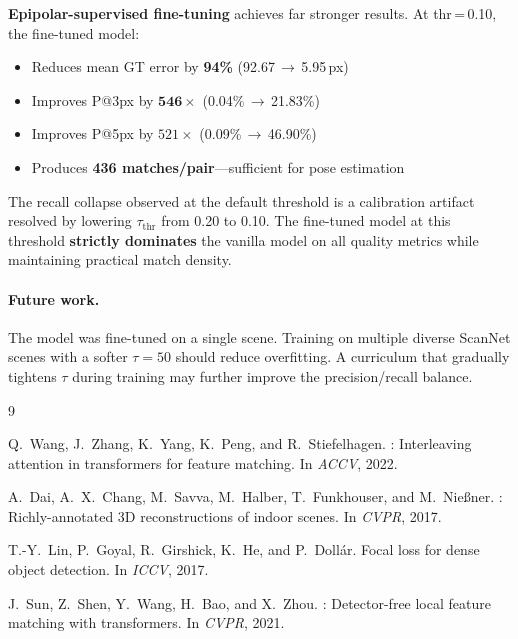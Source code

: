 \documentclass[10pt]{article}
\begin{document}
\textbf{Epipolar-supervised fine-tuning} achieves far stronger results. At thr\,=\,0.10, the fine-tuned model:
\begin{itemize}[leftmargin=*,itemsep=1pt]
    \item Reduces mean GT error by \textbf{94\%} (92.67\,$\to$\,5.95\,px)
    \item Improves P@3px by $\mathbf{546\times}$ (0.04\%\,$\to$\,21.83\%)
    \item Improves P@5px by $521\times$ (0.09\%\,$\to$\,46.90\%)
    \item Produces \textbf{436 matches/pair}---sufficient for pose estimation
\end{itemize}

The recall collapse observed at the default threshold is a calibration artifact resolved by lowering $\tau_{\text{thr}}$ from 0.20 to 0.10. The fine-tuned model at this threshold \textbf{strictly dominates} the vanilla model on all quality metrics while maintaining practical match density.

\paragraph{Future work.} The model was fine-tuned on a single scene. Training on multiple diverse ScanNet scenes with a softer $\tau = 50$ should reduce overfitting. A curriculum that gradually tightens $\tau$ during training may further improve the precision/recall balance.


\begin{thebibliography}{9}

Q.~Wang, J.~Zhang, K.~Yang, K.~Peng, and R.~Stiefelhagen.
: Interleaving attention in transformers for feature matching.
\newblock In \emph{ACCV}, 2022.

A.~Dai, A.~X.~Chang, M.~Savva, M.~Halber, T.~Funkhouser, and M.~Nie{\ss}ner.
: Richly-annotated 3D reconstructions of indoor scenes.
\newblock In \emph{CVPR}, 2017.

T.-Y.~Lin, P.~Goyal, R.~Girshick, K.~He, and P.~Doll{\'a}r.
\newblock Focal loss for dense object detection.
\newblock In \emph{ICCV}, 2017.

J.~Sun, Z.~Shen, Y.~Wang, H.~Bao, and X.~Zhou.
: Detector-free local feature matching with transformers.
\newblock In \emph{CVPR}, 2021.

\end{thebibliography}
\end{document}
